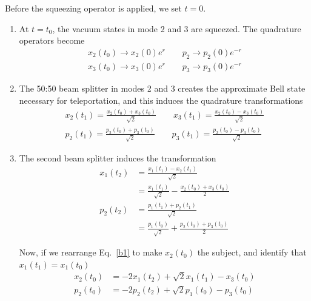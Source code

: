 \documentclass[reprint,
superscriptaddress,
 amsmath,amssymb,
 aps,
prb,
]{revtex4-1}
\begin{document}
Before the squeezing operator is applied, we set $t=0$.
\begin{enumerate}
\item At $t=t_0$, the vacuum states in mode 2 and 3 are squeezed. The quadrature operators become
\begin{align}
x_2(t_0) \rightarrow x_2(0) e^{r} \qquad p_2 \rightarrow p_2(0) e^{-r} \\
x_3(t_0) \rightarrow x_3(0) e^{r} \qquad p_3 \rightarrow p_3(0) e^{-r}
\end{align}
% 
\item The 50:50 beam splitter in modes 2 and 3 creates the approximate
Bell state necessary for teleportation, and this induces the quadrature
transformations
\begin{align}
x_2 (t_1) = \frac{x_2(t_0) + x_3(t_0)}{\sqrt 2} \qquad x_3 (t_1) = \frac{x_2(t_0) - x_3(t_0)}{\sqrt 2} \nonumber\\
p_2 (t_1) = \frac{p_2(t_0) + p_3(t_0)}{\sqrt 2} \qquad p_3 (t_1) = \frac{p_2(t_0) - p_3(t_0)}{\sqrt 2}
\end{align}
\item The second beam splitter induces the transformation
\begin{align}
x_1 (t_2) &= \frac{x_1(t_1) - x_2(t_1)}{\sqrt 2} \\
		  &= \frac{x_1(t_1)}{\sqrt 2} - \frac{x_2(t_0) + x_3(t_0)}{2} \label{b1}\\
p_2 (t_2) &= \frac{p_1(t_1) + p_2(t_1)}{\sqrt 2} \\
		  &=\frac{p_1 (t_0)}{\sqrt 2} +  \frac{p_2(t_0) + p_3(t_0)}{ 2} 
\end{align}
% 

\noindent Now, if we rearrange Eq.~\eqref{b1} to make $x_2(t_0)$ the subject, and identify that $x_1(t_1) = x_1 (t_0)$
\begin{align}
x_2(t_0) &= -2 x_1(t_2)+ \sqrt 2x_1(t_1) - x_3(t_0) \\
p_2(t_0) &= -  2p_2(t_2)  + \sqrt 2 p_1 (t_0) - p_3 (t_0)
\end{align}


\end{enumerate}
\end{document}
